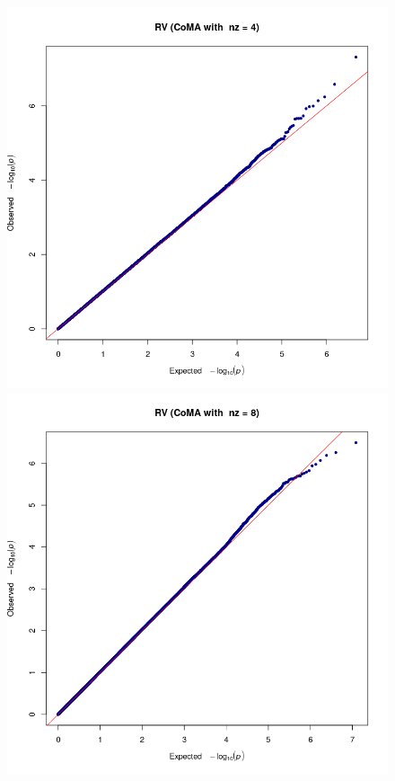 \documentclass[twocolumn]{llncs}
\begin{document}
\begin{figure}
\includegraphics[width=\linewidth]{figs/gwas/2020-04-19_10_01_33_510833__RV__nz__4__gwas__qqplot__inv_norm__GBR.png}
\includegraphics[width=\linewidth]{figs/gwas/2020-04-30_17_29_19_775837__RV__nz__8__gwas__qqplot__inv_norm__GBR.png}

\end{figure}
\end{document}
